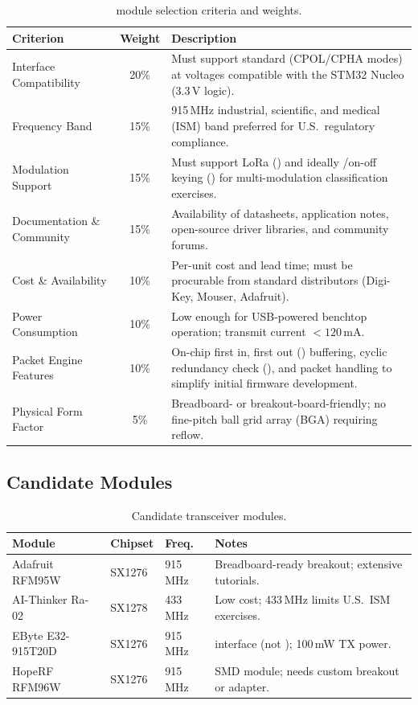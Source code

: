 \documentclass[11pt,letterpaper]{article}
\begin{document}
	\begin{table}[ht!]
		\centering
		\caption{\RF{} module selection criteria and weights.}
		\label{tab:criteria}
		\renewcommand{\arraystretch}{1.3}
		\begin{tabularx}{\textwidth}{l c X}
			\toprule
			\textbf{Criterion} & \textbf{Weight} & \textbf{Description} \\
			\midrule
			\SPI{} Interface Compatibility & 20\% & Must support standard \SPI{} (CPOL/CPHA modes) at voltages compatible with the STM32 Nucleo (3.3\,V logic). \\
			Frequency Band & 15\% & 915\,MHz industrial, scientific, and medical (ISM) band preferred for U.S.\ regulatory compliance. \\
			Modulation Support & 15\% & Must support LoRa (\CSS{}) and ideally \FSK{}/on-off keying (\OOK{}) for multi-modulation classification exercises. \\
			Documentation \& Community & 15\% & Availability of datasheets, application notes, open-source driver libraries, and community forums. \\
			Cost \& Availability & 10\% & Per-unit cost and lead time; must be procurable from standard distributors (Digi-Key, Mouser, Adafruit). \\
			Power Consumption & 10\% & Low enough for USB-powered benchtop operation; transmit current $< 120$\,mA. \\
			Packet Engine Features & 10\% & On-chip first in, first out (\FIFO{}) buffering, cyclic redundancy check (\CRC{}), and packet handling to simplify initial firmware development. \\
			Physical Form Factor & 5\% & Breadboard- or breakout-board-friendly; no fine-pitch ball grid array (BGA) requiring reflow. \\
			\bottomrule
		\end{tabularx}
	\end{table}
	
	\newpage
	\subsection{Candidate Modules}
	
	\begin{table}[ht!]
		\centering
		\caption{Candidate \RF{} transceiver modules.}
		\label{tab:candidates}
		\renewcommand{\arraystretch}{1.3}
		\begin{tabularx}{\textwidth}{l l l X}
			\toprule
			\textbf{Module} & \textbf{Chipset} & \textbf{Freq.} & \textbf{Notes} \\
			\midrule
			Adafruit RFM95W & SX1276 & 915\,MHz & Breadboard-ready breakout; extensive tutorials. \\
			AI-Thinker Ra-02 & SX1278 & 433\,MHz & Low cost; 433\,MHz limits U.S.\ ISM exercises. \\
			EByte E32-915T20D & SX1276 & 915\,MHz & \UART{} interface (not \SPI{}); 100\,mW TX power. \\
			HopeRF RFM96W & SX1276 & 915\,MHz & SMD module; needs custom breakout or adapter. \\
			\bottomrule
		\end{tabularx}
	\end{table}
	
\end{document}
